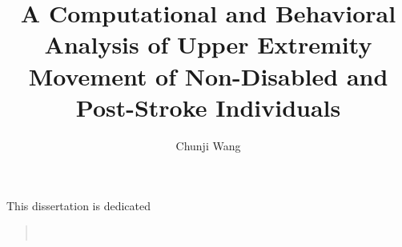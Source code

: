 \documentclass{report}
\begin{document}

\title{A Computational and Behavioral Analysis of Upper Extremity Movement of Non-Disabled and Post-Stroke Individuals}

\author{Chunji Wang}




\begin{preface}

    This dissertation is dedicated
     \begin{quote}
         \\
     \end{quote}

    

  \tableofcontents
  \listoftables
  \listoffigures

\end{preface}












\begin{singlespace}
  \appendix
%  
\end{singlespace}


\end{document}
